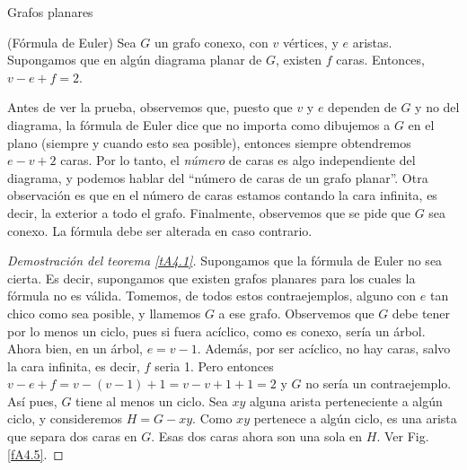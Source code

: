 \begin{section}{Grafos planares}
\begin{teorema}\label{tA4.1} (Fórmula de Euler) Sea $G$ un grafo
conexo, con $v$ vértices, y $e$ aristas. Supongamos que en algún
diagrama planar de $G$, existen $f$ caras. Entonces, $v-e+f=2$.
\end{teorema}

Antes de ver la prueba, observemos que, puesto que $v$ y $e$
dependen de $G$ y no del diagrama, la fórmula de Euler dice que no
importa como dibujemos a $G$ en el plano (siempre y cuando esto
sea posible), entonces siempre obtendremos $e-v+2$ caras. Por lo
tanto, el {\it número} de caras es algo independiente del
diagrama, y podemos hablar del ``número de caras de un grafo
planar''. Otra observación es que en el número de caras estamos
contando la cara infinita, es decir, la exterior a todo el grafo.
Finalmente, observemos que se pide que $G$ sea conexo. La fórmula
debe ser alterada en caso contrario.



\begin{proof}[Demostración del teorema \ref{tA4.1}]
Supongamos que la fórmula de Euler no sea cierta. Es decir,
supongamos que existen grafos planares para los cuales la fórmula
no es válida. Tomemos, de todos estos contraejemplos, alguno con
$e$ tan chico como sea posible, y llamemos $G$ a ese grafo.
Observemos que $G$ debe tener por lo menos un ciclo, pues si fuera
acíclico, como es conexo, sería un árbol. Ahora bien, en un árbol,
$e=v-1$. Además, por ser acíclico, no hay caras, salvo la cara
infinita, es decir, $f$ seria 1. Pero entonces
$v-e+f=v-(v-1)+1=v-v+1+1=2$ y $G$ no sería un contraejemplo. Así
pues, $G$ tiene al menos un ciclo. Sea $xy$ alguna arista
perteneciente a algún ciclo, y consideremos $H=G-xy$. Como $xy$
pertenece a algún ciclo, es una arista que separa dos caras en
$G$. Esas dos caras ahora son una sola en $H$. 
Ver Fig. \ref{fA4.5}.



\end{proof}
\end{section}
